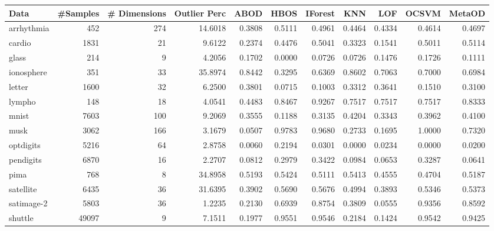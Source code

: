 \begin{sidewaystable}
    \centering
\begin{tabular}{lrrrrrrrrrr}
\toprule
      Data &  \#Samples &  \# Dimensions &  Outlier Perc &   ABOD &   HBOS &  IForest &    KNN &    LOF &  OCSVM &  MetaOD \\
\midrule
arrhythmia &       452 &           274 &       14.6018 & 0.3808 & 0.5111 &   0.4961 & 0.4464 & 0.4334 & 0.4614 &  0.4697 \\
    cardio &      1831 &            21 &        9.6122 & 0.2374 & 0.4476 &   0.5041 & 0.3323 & 0.1541 & 0.5011 &  0.5114 \\
     glass &       214 &             9 &        4.2056 & 0.1702 & 0.0000 &   0.0726 & 0.0726 & 0.1476 & 0.1726 &  0.1111 \\
ionosphere &       351 &            33 &       35.8974 & 0.8442 & 0.3295 &   0.6369 & 0.8602 & 0.7063 & 0.7000 &  0.6984 \\
    letter &      1600 &            32 &        6.2500 & 0.3801 & 0.0715 &   0.1003 & 0.3312 & 0.3641 & 0.1510 &  0.3100 \\
    lympho &       148 &            18 &        4.0541 & 0.4483 & 0.8467 &   0.9267 & 0.7517 & 0.7517 & 0.7517 &  0.8333 \\
     mnist &      7603 &           100 &        9.2069 & 0.3555 & 0.1188 &   0.3135 & 0.4204 & 0.3343 & 0.3962 &  0.4100 \\
      musk &      3062 &           166 &        3.1679 & 0.0507 & 0.9783 &   0.9680 & 0.2733 & 0.1695 & 1.0000 &  0.7320 \\
 optdigits &      5216 &            64 &        2.8758 & 0.0060 & 0.2194 &   0.0301 & 0.0000 & 0.0234 & 0.0000 &  0.0200 \\
 pendigits &      6870 &            16 &        2.2707 & 0.0812 & 0.2979 &   0.3422 & 0.0984 & 0.0653 & 0.3287 &  0.0641 \\
      pima &       768 &             8 &       34.8958 & 0.5193 & 0.5424 &   0.5111 & 0.5413 & 0.4555 & 0.4704 &  0.5187 \\
 satellite &      6435 &            36 &       31.6395 & 0.3902 & 0.5690 &   0.5676 & 0.4994 & 0.3893 & 0.5346 &  0.5373 \\
satimage-2 &      5803 &            36 &        1.2235 & 0.2130 & 0.6939 &   0.8754 & 0.3809 & 0.0555 & 0.9356 &  0.8592 \\
   shuttle &     49097 &             9 &        7.1511 & 0.1977 & 0.9551 &   0.9546 & 0.2184 & 0.1424 & 0.9542 &  0.9425 \\

\end{tabular}
\end{sidewaystable}
